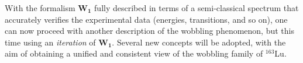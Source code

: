With the formalism $\mathbf{W_1}$ fully described in terms of a semi-classical spectrum that accurately verifies the experimental data (energies, transitions, and so on), one can now proceed with another description of the wobbling phenomenon, but this time using an \emph{iteration} of $\mathbf{W_1}$. Several new concepts will be adopted, with the aim of obtaining a unified and consistent view of the wobbling family of $^{163}$Lu.